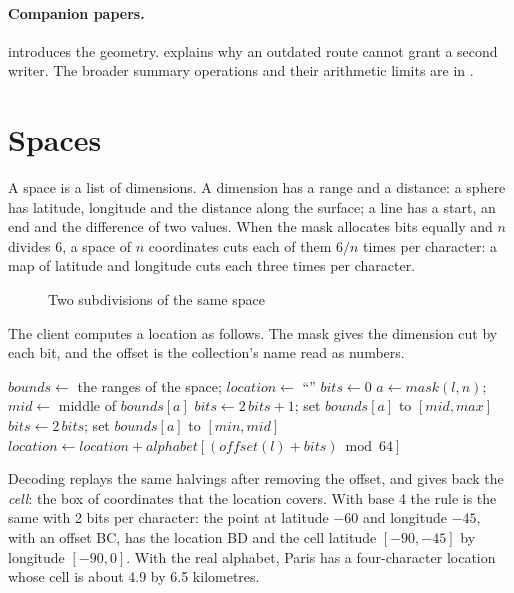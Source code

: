 \documentclass[11pt]{article}
\begin{document}
\paragraph{Companion papers.}
 introduces the geometry.
 explains why
an outdated route cannot grant a second writer. The broader summary operations
and their arithmetic limits are in .

\section{Spaces}\hypertarget{ix:spaces}{}
A space is a list of dimensions. A dimension has a range and a distance: a sphere has latitude, longitude and the distance along the surface; a line has a start, an end and the difference of two values. When the mask allocates bits equally and $n$ divides 6, a space of $n$ coordinates cuts each of them $6/n$ times per character: a map of latitude and longitude cuts each three times per character.

\begin{figure}[H]
    \centering
    \caption{Two subdivisions of the same space}
\end{figure}

The client computes a location as follows. The mask gives the dimension cut by each bit, and the offset is the collection's name read as numbers.

\begin{algorithm}[H]
\caption{Location of a point}
\begin{algorithmic}[1]
\State $bounds \gets$ the ranges of the space; $location \gets$ ``''
  \State $bits \gets 0$
    \State $a \gets mask(l, n)$; $mid \gets$ middle of $bounds[a]$
     $bits \gets 2\,bits + 1$; set $bounds[a]$ to $[mid, max]$
    \Else\ $bits \gets 2\,bits$; set $bounds[a]$ to $[min, mid]$
    \EndIf
  \EndFor
  \State $location \gets location + alphabet[(offset(l) + bits) \bmod 64]$
\EndFor
\end{algorithmic}
\end{algorithm}

Decoding replays the same halvings after removing the offset, and gives back the \emph{cell}: the box of coordinates that the location covers. With base 4 the rule is the same with 2 bits per character: the point at latitude $-60$ and longitude $-45$, with an offset BC, has the location BD and the cell latitude $[-90,-45]$ by longitude $[-90,0]$. With the real alphabet, Paris has a four-character location whose cell is about 4.9 by 6.5 kilometres.
\end{document}
